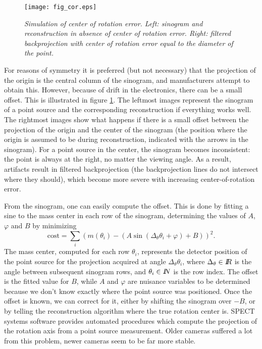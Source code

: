 \begin{figure}[t]
\centering
\texttt{[image: fig\_cor.eps]}
\caption{\label{fig:cor} \emph{Simulation of center of rotation error. Left:
sinogram and reconstruction in absence of center of rotation error. Right:
filtered backprojection with center of rotation error equal to the diameter of
the point.}}
\end{figure}
%
For reasons of symmetry it is preferred (but not necessary) that the
projection of the origin is the central column of the sinogram, and
manufacturers attempt to obtain this. However, because of drift in the
electronics, there can be a small offset. This is illustrated in figure
\ref{fig:cor}. The leftmost images represent the sinogram of a point source
and the corresponding reconstruction if everything works well. The rightmost
images show what happens if there is a small offset between the projection of
the origin and the center of the sinogram (the position where the origin is
assumed to be during reconstruction, indicated with the arrows in the
sinogram). For a point source in the center, the sinogram becomes
inconsistent: the point is always at the right, no matter the viewing
angle. As a result, artifacts result in filtered backprojection (the
backprojection lines do not intersect where they should), which become more
severe with increasing center-of-rotation error.

From the sinogram, one can easily compute the offset. This is done by
fitting a sine to the mass center in each row of the sinogram,
determining the values of $A$, $\varphi$ and $B$ by minimizing
\begin{equation}
 \mbox{cost} = 
  \sum_i \left(m(\theta_i) 
           - (A \sin(\Delta_\theta \theta_i + \varphi) + B)\right)^2.
\end{equation}
The mass center, computed for each row $\theta_i$, represents the
detector position of the point source for the projection acquired at
angle $\Delta_\theta \theta_i$, where $\Delta_\theta \in \mbox{$I\!\!R$}$ is the
angle between subsequent sinogram rows, and $\theta_i \in \mbox{$I\!\!N$}$ is the
row index. The offset is the fitted value for $B$, while $A$ and
$\varphi$ are nuisance variables to be determined because we don't
know exactly where the point source was positioned. Once the offset is
known, we can correct for it, either by shifting the sinogram over $-B$,
or by telling the reconstruction algorithm where the true rotation
center is. SPECT systems software provides automated procedures which
compute the projection of the rotation axis from a point source
measurement. Older cameras suffered a lot from this problem, newer
cameras seem to be far more stable.


